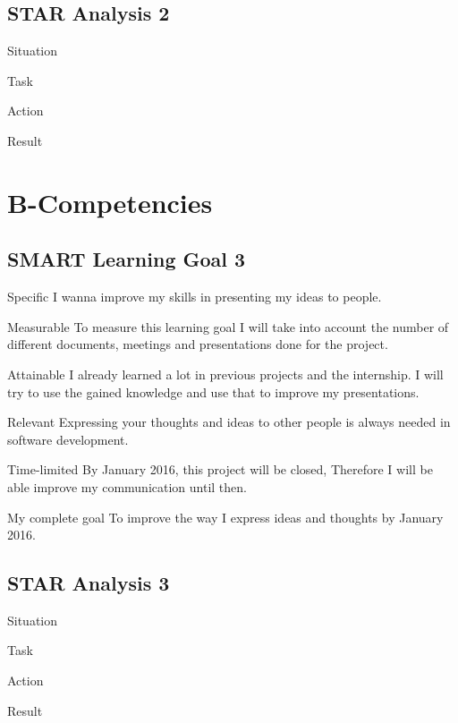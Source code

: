 \documentclass[12pt]{article}
\begin{document}
\subsection{STAR Analysis 2}
\begin{STAR}
    \item[Situation]
    \item[Task]
    \item[Action]
    \item[Result]
\end{STAR}

\section{B-Competencies}

\subsection{SMART Learning Goal 3}
\begin{SMART}
    \item[Specific] I wanna improve my skills in presenting my ideas to people.
    \item[Measurable] To measure this learning goal I will take into account the number of different documents, meetings and presentations done for the project.
    \item[Attainable] I already learned a lot in previous projects and the internship. I will try to use the gained knowledge and use that to improve my presentations.
    \item[Relevant] Expressing your thoughts and ideas to other people is always needed in software development.
    \item[Time-limited] By January 2016, this project will be closed, Therefore I will be able improve my communication until then.
    \item[My complete goal] To improve the way I express ideas and thoughts by January 2016.
\end{SMART}

\subsection{STAR Analysis 3}
\begin{STAR}
    \item[Situation]
    \item[Task]
    \item[Action]
    \item[Result]
\end{STAR}



%
\end{document}
